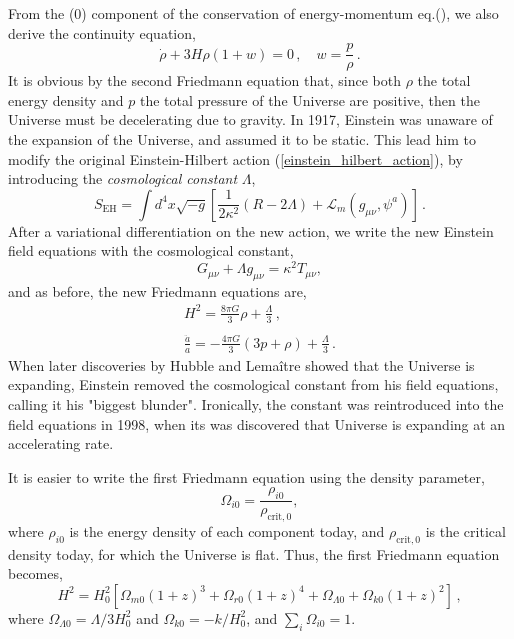 \documentclass{book}
\begin{document}
	From the (0) component of the conservation of energy-momentum eq.(), we also derive the continuity equation,
	\begin{equation}
		\label{continuity_equation}
		\dot \rho +3H\rho (1+w)=0 \, , \quad w=\frac{p}{\rho} \, .
	\end{equation}
	It is obvious by the second Friedmann equation that, since both $\rho$ the total energy density and $p$ the total pressure of the Universe are positive, then the Universe must be decelerating due to gravity. In 1917, Einstein was unaware of the expansion of the Universe, and assumed it to be static. This lead him to modify the original Einstein-Hilbert action (\ref{einstein_hilbert_action}), by introducing the \textit{cosmological constant} $\Lambda$,
	\begin{equation}
		\label{eh_action_with_lambda}
		S_{\text{EH}}=\int d^4x \sqrt{-g}\left[ \frac{1}{2\kappa^2}(R-2\Lambda)+\mathcal{L}_m(g_{\mu\nu},\psi^a) \right] \, .
	\end{equation}
	After a variational differentiation on the new action, we write the new Einstein field equations with the cosmological constant,
	\begin{equation}
		\label{einstein_field_equations_with_lambda}
		G_{\mu\nu } + \Lambda g_{\mu\nu}=\kappa^2 T_{\mu\nu},
	\end{equation}
	and as before, the new Friedmann equations are,
	\begin{equation}
		\label{Friedmann_equations_with_lambda}
		\begin{array}{c}
			H^2=\frac{8\pi G}{3}\rho + \frac{\Lambda}{3} \, , \\ \, \\
			\frac{\ddot a}{a}=-\frac{4\pi G}{3}(3p+\rho)+\frac{\Lambda}{3} \, .
		\end{array}
	\end{equation}
	When later discoveries by Hubble and Lemaître showed that the Universe is expanding, Einstein removed the cosmological constant from his field equations, calling it his "biggest blunder". Ironically, the constant was reintroduced into the field equations in 1998, when its was discovered that Universe is expanding at an accelerating rate.
	
	It is easier to write the first Friedmann equation using the density parameter,
	\begin{equation}
		\label{density_parameter}
		\Omega_{i0}=\frac{\rho_{i0}}{\rho_{\text{crit},0}},
	\end{equation}
	where $\rho_{i0}$ is the energy density of each component today, and $\rho_{\text{crit},0}$ is the critical density today, for which the Universe is flat. Thus, the first Friedmann equation becomes,
	\begin{equation}
		\label{Friedmann_equation_density}
		H^2=H_0^2 \left[\Omega_{m0} (1+z)^3 + \Omega_{r0} (1+z)^4 + \Omega_{\Lambda 0} + \Omega_{k0} (1+z)^2\right] \, ,
	\end{equation}
	where $\Omega_{\Lambda 0}=\Lambda/3H_0^2$ and $\Omega_{k0}=-k/H_0^2$, and $\sum_i \Omega_{i0} = 1$. 
	 
\end{document}
